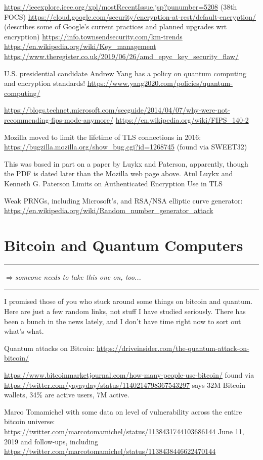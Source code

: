 \documentclass[%
 aip,
 jmp,%
 amsmath,amssymb,
 reprint,%
]{revtex4-1}
\def\outlinecomment#1{\hrule{\color{Blue}$\Rightarrow${\small\em #1}}\hrule}
\begin{document}
\url{https://ieeexplore.ieee.org/xpl/mostRecentIssue.jsp?punumber=5208}
(38th FOCS)
\url{https://cloud.google.com/security/encryption-at-rest/default-encryption/}
(describes some of Google's current practices and planned upgrades wrt
encryption)
\url{https://info.townsendsecurity.com/km-trends}
\url{https://en.wikipedia.org/wiki/Key_management}
\url{https://www.theregister.co.uk/2019/06/26/amd_epyc_key_security_flaw/}

U.S. presidential candidate Andrew Yang has a policy on quantum
computing and encryption standards!
\url{https://www.yang2020.com/policies/quantum-computing/}

\url{https://blogs.technet.microsoft.com/secguide/2014/04/07/why-were-not-recommending-fips-mode-anymore/}
\url{https://en.wikipedia.org/wiki/FIPS_140-2}

Mozilla moved to limit the lifetime of TLS connections in 2016:
\url{https://bugzilla.mozilla.org/show_bug.cgi?id=1268745}
(found via SWEET32)

This was based in part on a paper by Luykx and Paterson, apparently,
though the PDF is dated later than the Mozilla web page above.
Atul Luykx and Kenneth G. Paterson
Limits on Authenticated Encryption Use in TLS

Weak PRNGs, including Microsoft's, and RSA/NSA elliptic curve
generator:
\url{https://en.wikipedia.org/wiki/Random_number_generator_attack}

\appendix
\onecolumngrid

\section{Bitcoin and Quantum Computers}

\outlinecomment{someone needs to take this one on, too...}

I promised those of you who stuck around some things on bitcoin and
quantum.  Here are just a few random links, not stuff I have studied
seriously.  There has been a bunch in the news lately, and I don't
have time right now to sort out what's what.

Quantum attacks on Bitcoin:
\url{https://driveinsider.com/the-quantum-attack-on-bitcoin/}

\url{https://www.bitcoinmarketjournal.com/how-many-people-use-bitcoin/}
found via
\url{https://twitter.com/yayayday/status/1140214798367543297}
says 32M Bitcoin wallets, 34\% are active users, 7M active.

Marco Tomamichel with some data on level of vulnerability across the
entire bitcoin universe:
\url{https://twitter.com/marcotomamichel/status/1138431744103686144}
June 11, 2019
and follow-ups, including
\url{https://twitter.com/marcotomamichel/status/1138438446622470144}
\end{document}
